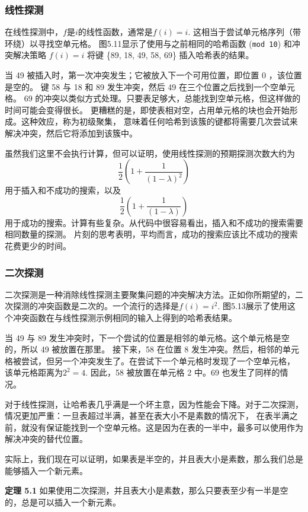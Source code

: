 \documentclass[a4paper]{ctexart}
\theoremstyle{definition}
\theoremstyle{definition}
\begin{document}
\subsubsection{线性探测}

在线性探测中，$f$是$i$的线性函数，通常是$f(i) = i$. 这相当于尝试单元格序列（带环绕）以寻找空单元格。
图5.11显示了使用与之前相同的哈希函数 (\verb|mod 10|) 和冲突解决策略 $f(i) = i$ 将键 \{89, 18, 49, 58, 69\} 插入哈希表的结果。

当 49 被插入时，第一次冲突发生；它被放入下一个可用位置，即位置 0 ，该位置是空的。
键 58 与 18 和 89 发生冲突，然后 49 在三个位置之后找到一个空单元格。
69 的冲突以类似方式处理。只要表足够大，总能找到空单元格，但这样做的时间可能会变得很长。
更糟糕的是，即使表相对空，占用单元格的块也会开始形成。这种效应，称为初级聚集，
意味着任何哈希到该簇的键都将需要几次尝试来解决冲突，然后它将添加到该簇中。

虽然我们这里不会执行计算，但可以证明，使用线性探测的预期探测次数大约为 
$$
\frac{1}{2}(1 + \frac{1}{(1 - \lambda)^2})
$$
用于插入和不成功的搜索，以及
$$
\frac{1}{2}(1 + \frac{1}{(1 - \lambda)})
$$
用于成功的搜索。计算有些复杂。从代码中很容易看出，插入和不成功的搜索需要相同数量的探测。
片刻的思考表明，平均而言，成功的搜索应该比不成功的搜索花费更少的时间。

\subsubsection{二次探测}

二次探测是一种消除线性探测主要聚集问题的冲突解决方法。正如你所期望的，二次探测的冲突函数是二次的。一个流行的选择是$f(i) = i^2$. 
图5.13展示了使用这个冲突函数在与线性探测示例相同的输入上得到的哈希表结果。

当 49 与 89 发生冲突时，下一个尝试的位置是相邻的单元格。这个单元格是空的，所以 49 被放置在那里。
接下来，58 在位置 8 发生冲突。然后，相邻的单元格被尝试，但另一个冲突发生了。在尝试下一个单元格时发现了一个空单元格，
该单元格距离为$2^2 = 4$. 因此，58 被放置在单元格 2 中。69 也发生了同样的情况。

对于线性探测，让哈希表几乎满是一个坏主意，因为性能会下降。对于二次探测，情况更加严重：一旦表超过半满，甚至在表大小不是素数的情况下，
在表半满之前，就没有保证能找到一个空单元格。这是因为在表的一半中，最多可以使用作为解决冲突的替代位置。

实际上，我们现在可以证明，如果表是半空的，并且表大小是素数，那么我们总是能够插入一个新元素。

\noindent \textbf{定理 5.1} 如果使用二次探测，并且表大小是素数，那么只要表至少有一半是空的，总是可以插入一个新元素。
\end{document}
